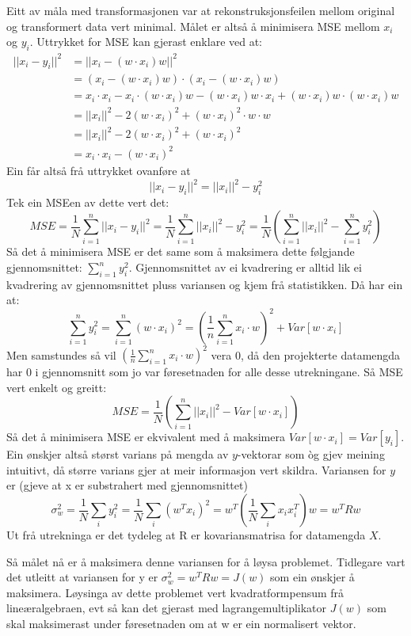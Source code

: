 \documentclass[oneside, nynorsk]{book}
\begin{document}
Eitt av måla med transformasjonen var at rekonstruksjonsfeilen mellom original og transformert data vert minimal.
Målet er altså å minimisera MSE mellom $x_i$ og $y_i$. Uttrykket for MSE kan gjerast enklare ved at:
\begin{align*}
||x_i-y_i||^2&=||x_i-(w\cdot x_i)w||^2 \\
&= (x_i-(w\cdot x_i)w)\cdot (x_i-(w\cdot x_i)w) \\
&= x_i\cdot x_i-x_i \cdot (w\cdot x_i)w-(w\cdot x_i)w\cdot x_i+(w\cdot x_i)w\cdot (w\cdot x_i)w \\
&= ||x_i||^2-2(w\cdot x_i)^2+(w\cdot x_i)^2\cdot w \cdot w \\
&= ||x_i||^2-2(w\cdot x_i)^2+(w\cdot x_i)^2 \\
&= x_i\cdot x_i - (w\cdot x_i)^2
\end{align*}
Ein får altså frå uttrykket ovanføre at
\[||x_i-y_i||^2=||x_i||^2-y_i^2\]
Tek ein MSEen av dette vert det:
\[MSE=\frac{1}{N}\sum_{i=1}^n ||x_i-y_i||^2=\frac{1}{N}\sum_{i=1}^n ||x_i||^2-y_i^2=\frac{1}{N}\left(\sum_{i=1}^n ||x_i||^2 - \sum_{i=1}^n y_i^2\right)\]
Så det å minimisera MSE er det same som å maksimera dette følgjande gjennomsnittet: $\sum_{i=1}^n y_i^2$.
Gjennomsnittet av ei kvadrering er alltid lik ei kvadrering av gjennomsnittet pluss variansen og kjem frå statistikken.
Då har ein at:
\[\sum_{i=1}^n y_i^2=\sum_{i=1}^n (w\cdot x_i)^2=\left(\frac{1}{n}\sum_{i=1}^n x_i \cdot w \right)^2+Var[w\cdot x_i]\]
Men samstundes så vil $\left(\frac{1}{n}\sum_{i=1}^n x_i \cdot w \right)^2$ vera 0, då den projekterte datamengda har 0 i gjennomsnitt som jo
var føresetnaden for alle desse utrekningane. Så MSE vert enkelt og greitt:
\[MSE=\frac{1}{N}\left(\sum_{i=1}^n ||x_i||^2 - Var[w\cdot x_i]\right)\]
Så det å minimisera MSE er ekvivalent med å maksimera $Var[w\cdot x_i]=Var[y_i]$.
Ein ønskjer altså størst varians på mengda av $y$-vektorar som òg gjev meining intuitivt, då større varians gjer at meir informasjon vert skildra.
Variansen for $y$ er (gjeve at x er substrahert med gjennomsnittet)
\[\sigma_w^2=\frac{1}{N}\sum_{i}y_i^2=\frac{1}{N}\sum_{i}(w^Tx_i)^2=w^T(\frac{1}{N}\sum_{i}x_ix_i^T)w=w^TRw\]
Ut frå utrekninga er det tydeleg at R er kovariansmatrisa for datamengda $X$.

Så målet nå er å maksimera denne variansen for å løysa problemet. Tidlegare vart det utleitt at variansen for y er
$\sigma_w^2=w^TRw=J(w)$ som ein ønskjer å maksimera. Løysinga av dette problemet vert kvadratformpensum frå lineæralgebraen,
evt så kan det gjerast med lagrangemultiplikator $J(w)$ som skal maksimerast under føresetnaden om at w er ein normalisert vektor.
\end{document}
